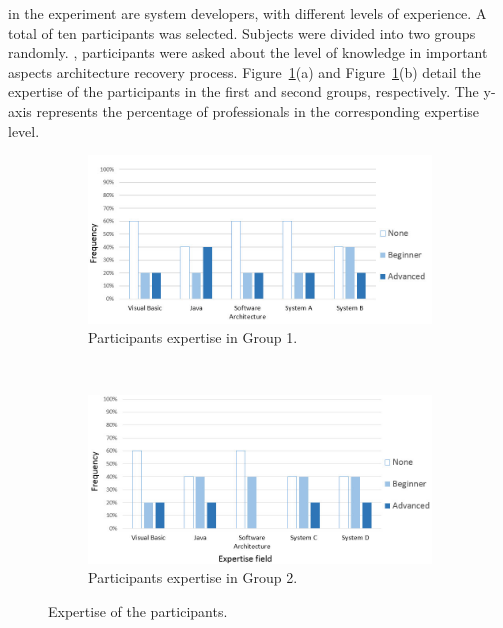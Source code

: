 \documentclass{sig-alternate-05-2015}
\begin{document}

 in the experiment are 
system developers, with different levels of experience. A total of ten 
participants was selected. Subjects were divided into two groups randomly.
, 
participants were asked about the level of 
knowledge in important aspects  architecture recovery 
process. Figure~\ref{fig:participantes}(a) and Figure~\ref{fig:participantes}(b) 
detail the expertise of the participants in the first and second groups, respectively. 
The y-axis represents the percentage of professionals in the corresponding expertise level.

\begin{figure}[t!]
 \begin{subfigure}[t]{0.5\textwidth}
	\centering
	\includegraphics[scale=0.25]{6_expertise_participantes_grupo_1_en}
	\caption{Participants expertise in Group 1.}
 \end{subfigure}
 ~
 \begin{subfigure}[t]{0.5\textwidth}
	\centering
	\includegraphics[scale=0.25]{6_expertise_participantes_grupo_2_en}
	\caption{Participants expertise in Group 2.}
 \end{subfigure}
\caption{Expertise of the participants.}
\label{fig:participantes}
\end{figure}
\end{document}
